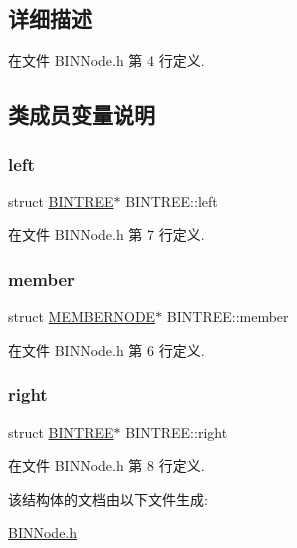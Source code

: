 \subsection{详细描述}


在文件 B\+I\+N\+Node.\+h 第 4 行定义.



\subsection{类成员变量说明}
\mbox{\label{struct_b_i_n_t_r_e_e_a4186a51481617735e0ad0ddc859a7ebf}} 
\subsubsection{\texorpdfstring{left}{left}}
{\footnotesize\ttfamily struct \hyperlink{struct_b_i_n_t_r_e_e}{B\+I\+N\+T\+R\+EE}$\ast$ B\+I\+N\+T\+R\+E\+E\+::left}



在文件 B\+I\+N\+Node.\+h 第 7 行定义.

\mbox{\label{struct_b_i_n_t_r_e_e_a3ab2c8b4cbbacb80e686e334208c5d48}} 
\subsubsection{\texorpdfstring{member}{member}}
{\footnotesize\ttfamily struct \hyperlink{struct_m_e_m_b_e_r_n_o_d_e}{M\+E\+M\+B\+E\+R\+N\+O\+DE}$\ast$ B\+I\+N\+T\+R\+E\+E\+::member}



在文件 B\+I\+N\+Node.\+h 第 6 行定义.

\mbox{\label{struct_b_i_n_t_r_e_e_abe35ee9da1117f8df6d969647ad5ee19}} 
\subsubsection{\texorpdfstring{right}{right}}
{\footnotesize\ttfamily struct \hyperlink{struct_b_i_n_t_r_e_e}{B\+I\+N\+T\+R\+EE}$\ast$ B\+I\+N\+T\+R\+E\+E\+::right}



在文件 B\+I\+N\+Node.\+h 第 8 行定义.



该结构体的文档由以下文件生成\+:\begin{DoxyCompactItemize}
\item 
\hyperlink{_b_i_n_node_8h}{B\+I\+N\+Node.\+h}\end{DoxyCompactItemize}
